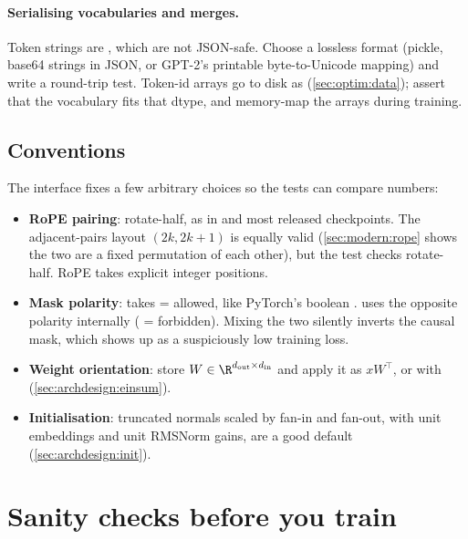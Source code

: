 \paragraph{Serialising vocabularies and merges.} Token strings are , which are not
JSON-safe. Choose a lossless format (pickle, base64 strings in JSON, or GPT-2's printable
byte-to-Unicode mapping) and write a round-trip test. Token-id arrays go to disk as 
(\cref{sec:optim:data}); assert that the vocabulary fits that dtype, and memory-map the arrays
during training.

\subsection{Conventions}\label{sec:proj1:conventions}

The interface fixes a few arbitrary choices so the tests can compare numbers:
\begin{itemize}
  \item \textbf{RoPE pairing}: rotate-half, as in  and most
        released checkpoints. The adjacent-pairs layout $(2k, 2k{+}1)$ is equally valid
        (\cref{sec:modern:rope} shows the two are a fixed permutation of each other), but the test
        checks rotate-half. RoPE takes explicit integer positions.
  \item \textbf{Mask polarity}:  takes  = allowed, like PyTorch's
        boolean .  uses the opposite polarity
        internally ( = forbidden). Mixing the two silently inverts the causal mask, which
        shows up as a suspiciously low training loss.
  \item \textbf{Weight orientation}: store $W\in\R^{d_\text{out}\times d_\text{in}}$ and apply it
        as $xW^\top$, or with  (\cref{sec:archdesign:einsum}).
  \item \textbf{Initialisation}: truncated normals scaled by fan-in and fan-out, with unit
        embeddings and unit RMSNorm gains, are a good default (\cref{sec:archdesign:init}).
\end{itemize}

\section{Sanity checks before you train}\label{sec:proj1:milestones}

